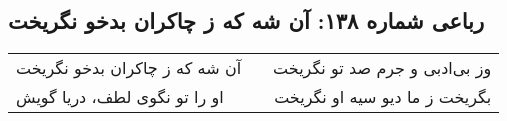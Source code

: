 \begin{center}
\section*{رباعی شماره ۱۳۸: آن شه که ز چاکران بدخو نگریخت}
\label{sec:0138}
\begin{longtable}{l p{0.5cm} r}
آن شه که ز چاکران بدخو نگریخت
&&
وز بی‌ادبی و جرم صد تو نگریخت
\\
او را تو نگوی لطف، دریا گویش
&&
بگریخت ز ما دیو سیه او نگریخت
\\
\end{longtable}
\end{center}
